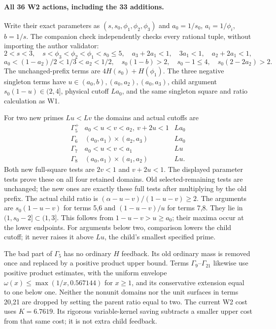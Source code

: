 \documentclass[11pt]{article}
\begin{document}
\paragraph{All 36 W2 actions, including the 33 additions.}
Write their exact parameters as $(s,s_0,\phi_1,\phi_2,\phi_3)$ and
$a_0=1/s_0$, $a_i=1/\phi_i$, $b=1/s$. The companion check independently
checks every rational tuple, without importing the author validator:
\[
2<s<3,\quad s<\phi_3<\phi_2<\phi_1<s_0\le5,
\quad a_3+2a_1<1,\quad3a_1<1,\quad a_2+2a_1<1,
\]
\[
a_0<(1-a_2)/2<1/3<a_2<1/2,
\quad s_0(1-b)>2,\quad s_0-1\le4,
\quad s_0(2-2a_2)>2.
\]
The unchanged-prefix terms are $4H(s_0)+H(\phi_1)$. The three
negative singleton terms have $u\in(a_0,b),(a_0,a_2),(a_0,a_3)$,
child argument $s_0(1-u)\in(2,4]$, physical cutoff $La_0$, and the
same singleton square and ratio calculation as W1.

For two new primes $Lu<Lv$ the domains and actual cutoffs are
\[
\begin{array}{c|c|c}
\Gamma_5^+&a_0<u<v<a_2,\ v+2u<1&La_0\\
\Gamma_6&(a_0,a_1)\times(a_2,a_3)&La_0\\
\Gamma_7&a_0<u<v<a_1&Lu\\
\Gamma_8&(a_0,a_1)\times(a_1,a_2)&Lu.
\end{array}
\]
Both new full-square tests are $2v<1$ and $v+2u<1$.
The displayed parameter tests prove these on all four retained domains.
Old selected-remaining tests are unchanged; the new ones are exactly
these full tests after multiplying by the old prefix. The actual child
ratio is $(\alpha-u-v)/(1-u-v)\ge2$. The arguments are
$s_0(1-u-v)$ for terms 5,6 and $(1-u-v)/u$ for terms 7,8.
They lie in $(1,s_0-2]\subset(1,3]$. This follows from
$1-u-v>u\ge a_0$; their maxima occur at the lower endpoints.
For arguments below two, comparison lowers the child cutoff; it never
raises it above $Lu$, the child's smallest specified prime.

The bad part of $\Gamma_5$ has no ordinary $H$ feedback. Its old
ordinary mass is removed once and replaced by a positive product upper
bound. Terms $\Gamma_9$--$\Gamma_{21}$ likewise use positive product
estimates, with the uniform envelope $\omega(x)\le\max(1/x,0.567144)$
for $x\ge1$, and its conservative extension equal to one below one.
Neither the nonunit domains nor the unit surfaces in terms 20,21 are
dropped by setting the parent ratio equal to two. The current W2 cost
uses $K=6.7619$. Its rigorous variable-kernel saving subtracts a smaller
upper cost from that same cost; it is not extra child feedback.
\end{document}
